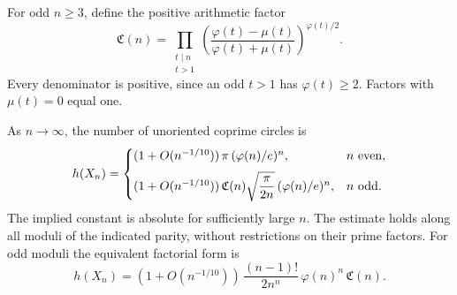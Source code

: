 For odd \(n\geq3\), define the positive arithmetic factor
\[
 {\mathfrak C}(n)=
 \prod_{\substack{t\mid n\\t>1}}
 \left(\frac{\varphi(t)-\mu(t)}
            {\varphi(t)+\mu(t)}\right)^{\varphi(t)/2}.
\]
Every denominator is positive, since an odd \(t>1\) has
\(\varphi(t)\geq2\).
Factors with \(\mu(t)=0\) equal one.

\begin{theorem}
\label{thm:relativecoprime}
As \(n\to\infty\), the number of unoriented coprime circles is
\[
 h(X_n)=
 \begin{cases}
 (1+O(n^{-1/10}))\,\pi\,(\varphi(n)/e)^n,&n\ {\rm even},\\[2mm]
 (1+O(n^{-1/10}))\,{\mathfrak C}(n)
       \sqrt{\dfrac{\pi}{2n}}\,(\varphi(n)/e)^n,
                                      &n\ {\rm odd}.
 \end{cases}
\]
The implied constant is absolute for sufficiently large \(n\).
The estimate holds along all moduli of the indicated parity,
without restrictions on their prime factors.
For odd moduli the equivalent factorial form is
\[
 h(X_n)=(1+O(n^{-1/10}))\,
       \frac{(n-1)!}{2n^n}\,\varphi(n)^n\,{\mathfrak C}(n).
\]
\end{theorem}
